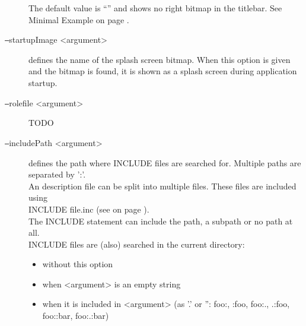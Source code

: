 \begin{description}
  The default value is ``'' and shows no right bitmap in the titlebar.
  See Minimal Example on page \pageref{fig:minimalExample}.
%
\item[\texttt{--}startupImage <argument>] defines the name of the splash screen bitmap.
  When this option is given and the bitmap is found, it is shown as a splash screen during application startup.
%
\item[\texttt{--}rolefile <argument>]
  TODO
%
\item[\texttt{--}includePath <argument>] defines the path where INCLUDE files are searched for.
  Multiple paths are separated by ':'. \\
  An \INTENS{} description file can be split into multiple files. These files are included using \\
  INCLUDE file.inc (see 
  on page \pageref{sec:opexamples:messagequeue:publishsubscribe}). \\
  The INCLUDE statement can include the path, a subpath or no path at all. \\
  INCLUDE files are (also) searched in the current directory:
  \begin{itemize}
  \item without this option
  \item when <argument> is an empty string
  \item when it is included in <argument> (as '.' or '': foo:, :foo, foo:., .:foo, foo::bar, foo:.:bar)
  \end{itemize}


\end{description}
